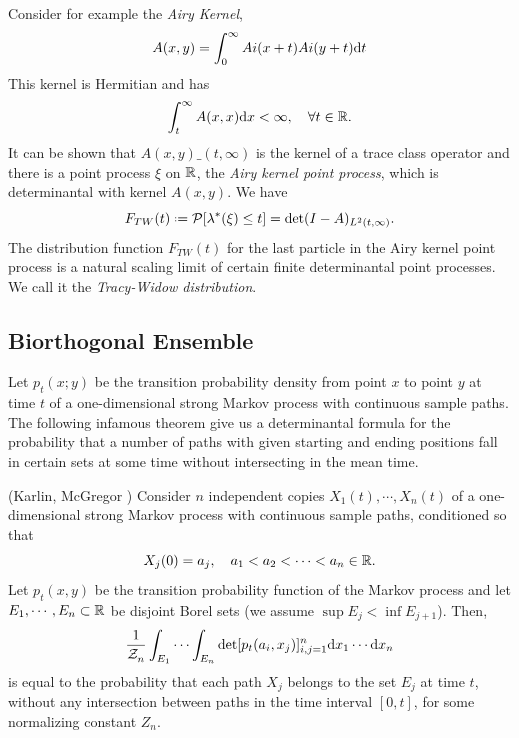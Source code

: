 Consider for example the \textit{Airy Kernel},
\begin{equation}
	A(x, y) = \int_{0}^{\infty} \Ai(x+t) \Ai(y + t) \dd t
\end{equation}
This kernel is Hermitian and has 
\begin{equation}
	\int_{t}^{\infty} A(x,x) \dd x < \infty, \quad \forall t \in \R.
\end{equation}
It can be shown that $A(x,y) \_{(t,\infty)}$ is the kernel of a trace class operator and there is a point process $\xi$ on $\R$, the \textit{Airy kernel point process}, which is determinantal with kernel $A(x,y)$. We have
\begin{equation}
	F_{TW}(t) \deff \eP[\lambda^*(\xi) \leq t] = \det(I - A)_{L^2(t, \infty)}.
\end{equation} 
The distribution function $F_{TW}(t)$ for the last particle in the Airy kernel point process is a natural scaling limit of certain finite determinantal point processes. We call it the \textit{Tracy-Widow distribution}.

\subsection{Biorthogonal Ensemble}

Let $p_t(x; y)$ be the transition probability density from point $x$ to point $y$ at time $t$ of a one-dimensional strong Markov process with continuous sample paths. The following infamous theorem give us a determinantal formula for the probability that a number of paths with given starting and ending positions fall in certain sets at some time without intersecting in the mean time.

\begin{thm}
(Karlin, McGregor \cite{Karlin-McGregor}) Consider $n$ independent copies $X_1(t), \cdots , X_n(t)$ of a one-dimensional strong Markov process with continuous sample paths, conditioned so that
\begin{equation}
	X_j(0) = a_j, \quad \mcmany{a}{n}{<} \in \R.
\end{equation}
Let $p_t(x, y)$ be the transition probability function
of the Markov process and let $E_1,\cdots, E_n \subset \R$ be disjoint Borel sets (we assume $\sup E_j < \inf E_{j+1}$). Then,
\begin{equation}
	\frac{1}{\pZ{n}{}} \int_{E_1} \cdots \int_{E_n} \det[p_t(a_i, x_j)]_{i,j = 1}^{n} \dd x_1 \cdots \dd x_n
\end{equation}
is equal to the probability that each path $X_j$ belongs to the set $E_j$ at time $t$, without any intersection between paths in the time interval $[0, t]$, for some normalizing constant $Z_n$.
\end{thm}

